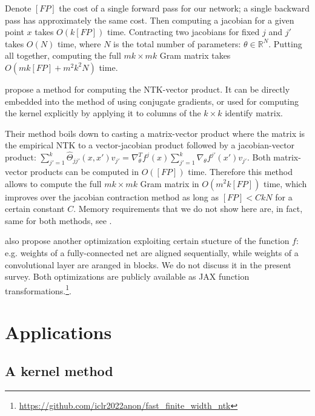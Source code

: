 \documentclass{article}
\newcommand{\RR}{\mathbb{R}}
\begin{document}
    Denote $[FP]$ the cost of a single forward pass for our network; a single backward pass has approximately the same cost.
    Then computing a jacobian for a given point $x$ takes $O(k [FP])$ time.
    Contracting two jacobians for fixed $j$ and $j'$ takes $O(N)$ time, where $N$ is the total number of parameters: $\theta \in \RR^N$.
    Putting all together, computing the full $mk \times mk$ Gram matrix takes $O(m k [FP] + m^2 k^2 N)$ time.

    \cite{novakfast} propose a method for computing the NTK-vector product.
    It can be directly embedded into the method of \cite{meanti2020kernel} using conjugate gradients, or used for computing the kernel explicitly by applying it to columns of the $k \times k$ identify matrix.

    Their method boils down to casting a matrix-vector product where the matrix is the empirical NTK to a vector-jacobian product followed by a jacobian-vector product: $\sum_{j'=1}^k \hat\Theta_{jj'}(x,x') v_{j'} = \nabla^T_\theta f^j(x) \sum_{j'=1}^k \nabla_\theta f^{j'}(x') v_{j'}$.
    Both matrix-vector products can be computed in $O([FP])$ time.
    Therefore this method allows to compute the full $mk \times mk$ Gram matrix in $O(m^2 k [FP])$ time, which improves over the jacobian contraction method as long as $[FP] < C k N$ for a certain constant $C$.
    Memory requirements that we do not show here are, in fact, same for both methods, see \cite{novakfast}.

    \cite{novakfast} also propose another optimization exploiting certain stucture of the function $f$: e.g. weights of a fully-connected net are aligned sequentially, while weights of a convolutional layer are aranged in blocks.
    We do not discuss it in the present survey.
    Both optimizations are publicly available as JAX \cite{jax2018github} function transformations.\footnote{\url{https://github.com/iclr2022anon/fast_finite_width_ntk}}.


    \section{Applications}

    \subsection{A kernel method}

\end{document}
